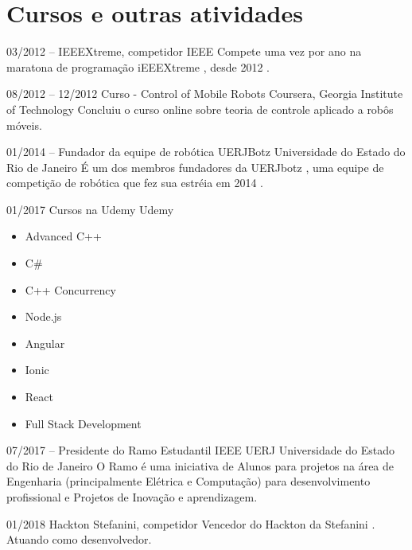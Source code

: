 \documentclass[]{friggeri-cv} %
\begin{document}

\section{Cursos e outras atividades}

\begin{entrylist}



\entry
{03/2012 -- }
{\hspace{.15cm}IEEEXtreme, competidor}
{IEEE}
{Compete uma vez por ano na maratona de programação iEEEXtreme , desde 2012 .}

\entry
{08/2012 -- 12/2012}
{\hspace{.15cm}Curso - Control of Mobile Robots}
{Coursera, Georgia Institute of Technology}
{Concluiu o curso online sobre teoria de controle aplicado a robôs móveis.}

\entry
{01/2014 -- }
{\hspace{.15cm}Fundador da equipe de robótica UERJBotz}
{Universidade do Estado do Rio de Janeiro}
{É um dos membros fundadores da UERJbotz , uma equipe de competição de robótica que fez sua estréia em 2014 .}

\entry
{01/2017}
{\hspace{.15cm}Cursos na Udemy}
{Udemy}
{\begin{itemize}
\item Advanced C++
\item C#
\item C++ Concurrency
\item Node.js
\item Angular
\item Ionic
\item React
\item Full Stack Development
\end{itemize}}

\entry
{07/2017 -- }
{\hspace{.15cm} Presidente do Ramo Estudantil IEEE UERJ}
{Universidade do Estado do Rio de Janeiro}
{O Ramo é uma iniciativa de Alunos para projetos na área de Engenharia (principalmente Elétrica e Computação) para desenvolvimento profissional e Projetos de Inovação e aprendizagem.}

\entry
{01/2018}
{\hspace{.15cm}Hackton Stefanini, competidor}
{}
{Vencedor do Hackton da Stefanini . Atuando como desenvolvedor.}


\end{entrylist}
\end{document}
